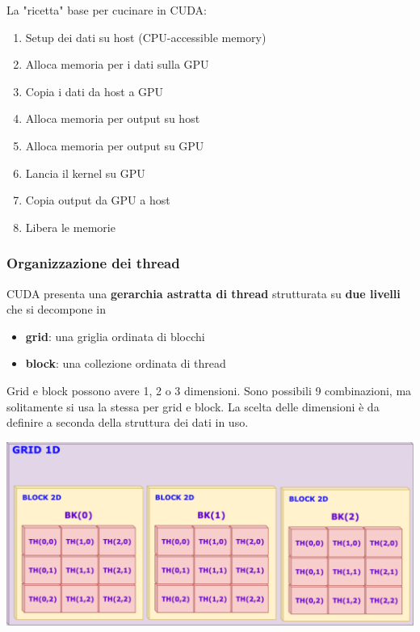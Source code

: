La "ricetta" base per cucinare in CUDA:
\begin{enumerate}
	\item Setup dei dati su host (CPU-accessible memory)
	
	\item Alloca memoria per i dati sulla GPU
	
	\item Copia i dati da host a GPU
	
	\item Alloca memoria per output su host
	
	\item Alloca memoria per output su GPU
	
	\item Lancia il kernel su GPU
	
	\item Copia output da GPU a host
	
	\item Libera le memorie
\end{enumerate}

\subsubsection{Organizzazione dei thread}

CUDA presenta una \textbf{gerarchia astratta di thread} strutturata su \textbf{due livelli} che si decompone in 
\begin{itemize}
	\item \textbf{grid}: una griglia ordinata di blocchi

	\item \textbf{block}: una collezione ordinata di thread
\end{itemize}

Grid e block possono avere 1, 2 o 3 dimensioni. Sono possibili 9 combinazioni, ma solitamente si usa la stessa per grid e block. La scelta delle dimensioni è da definire a seconda della struttura dei dati in uso.
\begin{center}
	\includegraphics[width=0.98\linewidth]{img/cuda/grdiblock}
\end{center}

